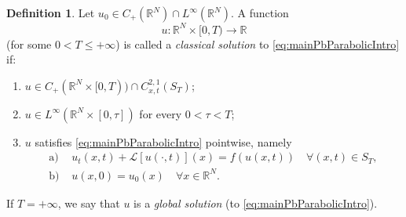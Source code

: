 \documentclass[11pt,a4paper,reqno]{amsart}
\theoremstyle{definition}
\newtheorem{definition}{Definition}[section]
\theoremstyle{plain}
\numberwithin{equation}{section}
\begin{document}
\begin{definition}\label{defsole}
Let $u_0\in C_+(\mathbb{R}^N)\cap L^\infty(\mathbb{R}^N)$. A function
$$u: \mathbb{R}^N\times[0,T)\to \mathbb{R}$$
(for some $0<T\leq+\infty$) is called a \emph{classical solution} to \eqref{eq:mainPbParabolicIntro} if:
\begin{enumerate}
 	\item $u\in C_+(\mathbb{R}^N\times[0,T))\cap  C^{2,1}_{x,t}(S_T)$;	
 	\vspace{0.1cm}
 	
	\item $u\in L^\infty(\mathbb{R}^N\times[0,\tau])$ for every $0<\tau<T$;

 	\vspace{0.1cm}
 	
	\item $u$ satisfies \eqref{eq:mainPbParabolicIntro} pointwise, namely
	\begin{align*}
	\mathrm{a)}\,\,&u_t(x,t)+\mathcal{L}[u(\cdot,t)](x) = f(u(x,t))	\quad\forall (x,t)\in S_T, \\
	\mathrm{b)}\,\,&u(x,0) = u_0(x)\quad\forall x\in\mathbb{R}^N.
	\end{align*}
\end{enumerate}
If $T=+\infty$, we say that $u$ is a \emph{global solution} (to \eqref{eq:mainPbParabolicIntro}).
\end{definition}
\end{document}
